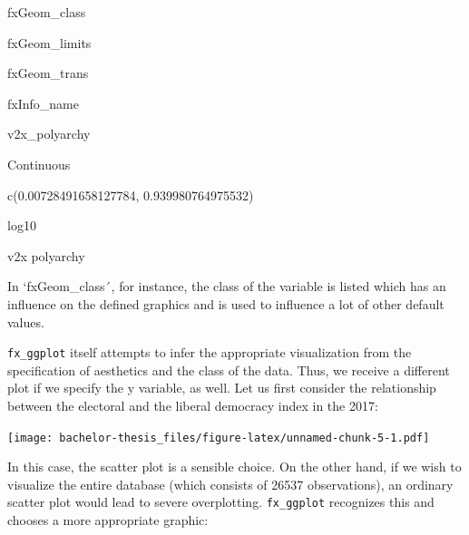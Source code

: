 \documentclass[]{report}
\newenvironment{Shaded}{\begin{snugshade}}{\end{snugshade}}
\newcommand{\KeywordTok}[1]{\textcolor[rgb]{0.13,0.29,0.53}{\textbf{#1}}}
\newcommand{\DataTypeTok}[1]{\textcolor[rgb]{0.13,0.29,0.53}{#1}}
\newcommand{\DecValTok}[1]{\textcolor[rgb]{0.00,0.00,0.81}{#1}}
\newcommand{\StringTok}[1]{\textcolor[rgb]{0.31,0.60,0.02}{#1}}
\newcommand{\OperatorTok}[1]{\textcolor[rgb]{0.81,0.36,0.00}{\textbf{#1}}}
\newcommand{\NormalTok}[1]{#1}
\theoremstyle{definition}
\theoremstyle{definition}
\theoremstyle{definition}
\theoremstyle{remark}
\begin{document}
fxGeom\_class

fxGeom\_limits

fxGeom\_trans

fxInfo\_name

v2x\_polyarchy

Continuous

c(0.00728491658127784, 0.939980764975532)

log10

v2x polyarchy

In `fxGeom\_class´, for instance, the class of the variable is listed
which has an influence on the defined graphics and is used to influence
a lot of other default values.

\texttt{fx\_ggplot} itself attempts to infer the appropriate
visualization from the specification of aesthetics and the class of the
data. Thus, we receive a different plot if we specify the y variable, as
well. Let us first consider the relationship between the electoral and
the liberal democracy index in the 2017:

\begin{Shaded}
\end{Shaded}

\texttt{[image: bachelor-thesis\_files/figure-latex/unnamed-chunk-5-1.pdf]}

In this case, the scatter plot is a sensible choice. On the other hand,
if we wish to visualize the entire database (which consists of 26537
observations), an ordinary scatter plot would lead to severe
overplotting. \texttt{fx\_ggplot} recognizes this and chooses a more
appropriate graphic:

\begin{Shaded}
\end{Shaded}
\end{document}
